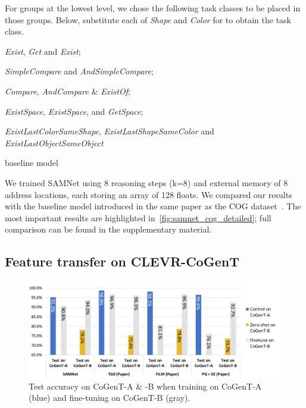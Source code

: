 For groups at the lowest level, we chose the following task classes to be placed in those groups.
Below, substitute each of \textit{Shape} and \textit{Color} for  \uX{} to obtain the task class.
\begin{description}
	\compresslist
	\item[Basic:] \textit{Exist}\uX, \textit{Get}\uX{} and \textit{Exist};
	\item[Obj-Attr:] \emph{SimpleCompare}\uX{} and \textit{AndSimpleCompare}\uX;
	\item[Compare:] \textit{Compare}\uX,  \textit{AndCompare}\uX{} \& \textit{Exist}\uX\textit{Of};
	\item[Spatial:] \textit{ExistSpace}, \textit{Exist}\uX\textit{Space}, and \textit{Get}\uX\textit{Space};
	\item[Cognitive:] \textit{ExistLastColorSameShape}, \textit{ExistLastShapeSameColor} and \textit{ExistLastObjectSameObject}
\end{description}



baseline model~\cite{yang2018dataset}

We trained SAMNet using 8 reasoning steps (k=8) and external memory of 8 address locations, each storing an array of 128 floats.
We compared our results with the baseline model introduced in the same paper as the COG dataset~\cite{yang2018dataset}.
The most important results are highlighted in~\cref{fig:samnet_cog_detailed}; full comparison can be found in the supplementary material.%



\newpage
\subsection{Feature transfer on CLEVR-CoGenT}



\begin{figure}[htbp]
	\centering
	\includegraphics[width=\columnwidth]{../results/CoGenT_B_results_with_baselines.pdf}
	\caption{Test accuracy on CoGenT-A \& -B when training on CoGenT-A (blue) and fine-tuning on CoGenT-B (gray).}
	\label{fig:CoGenT-B-results}
\end{figure}





